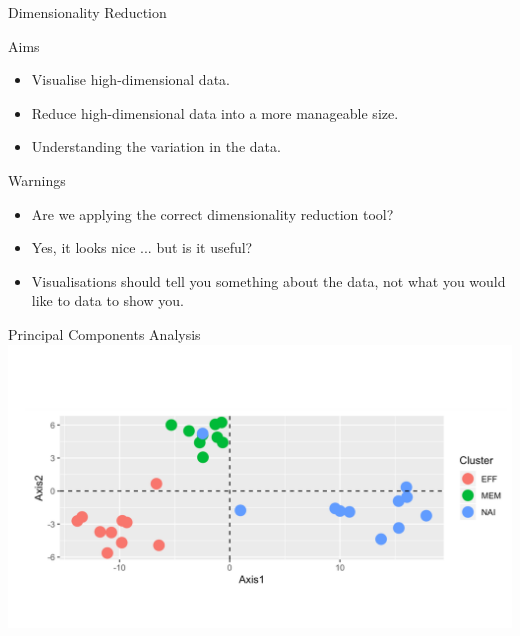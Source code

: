 \documentclass{bredelebeamer}
\begin{document}
\begin{frame}{Dimensionality Reduction}
\begin{block}{Aims}
\begin{itemize}
\item Visualise high-dimensional data.
\item Reduce high-dimensional data into a more manageable size.
\item Understanding the variation in the data.
\end{itemize}
\end{block}

\begin{alertblock}{Warnings}
\begin{itemize}
\item Are we applying the correct dimensionality reduction tool?
\item Yes, it looks nice ... but is it useful?
\item Visualisations should tell you something about the data, not what you would like to data to show you. 
\end{itemize}
\end{alertblock}

\end{frame}

\begin{frame}{Principal Components Analysis}
\includegraphics[width=1\textwidth]{pcaplot}
\end{frame}
\end{document}
